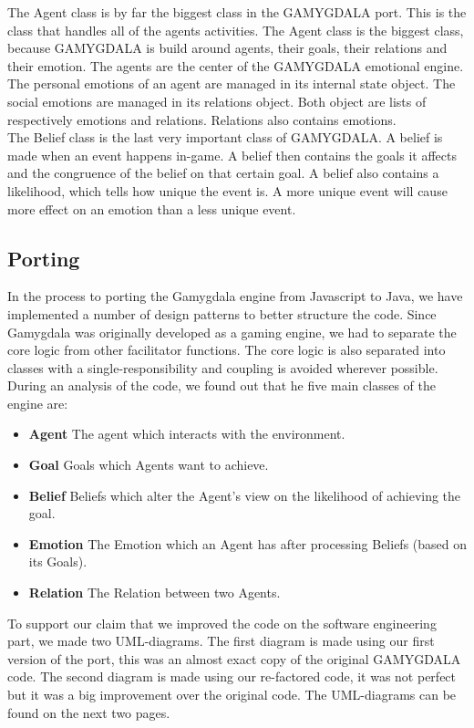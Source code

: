 The Agent class is by far the biggest class in the GAMYGDALA port. This is the class that handles all of the agents activities. The Agent class is the biggest class, because GAMYGDALA is build around agents, their goals, their relations and their emotion. The agents are the center of the GAMYGDALA emotional engine. The personal emotions of an agent are managed in its internal state object. The social emotions are managed in its relations object. Both object are lists of respectively emotions and relations. Relations also contains emotions. \\

The Belief class is the last very important class of GAMYGDALA. A belief is made when an event happens in-game. A belief then contains the goals it affects and the congruence of the belief on that certain goal. A belief also contains a likelihood, which tells how unique the event is. A more unique event will cause more effect on an emotion than a less unique event.

\subsection{Porting}
In the process to porting the Gamygdala engine from Javascript to Java, we have implemented a number of design patterns to better structure the code. Since Gamygdala was originally developed as a gaming engine, we had to separate the core logic from other facilitator functions. The core logic is also separated into classes with a single-responsibility and coupling is avoided wherever possible. \\

During an analysis of the code, we found out that he five main classes of the engine are:
\begin{itemize}
	\item \textbf{Agent} The agent which interacts with the environment.
	\item \textbf{Goal} Goals which Agents want to achieve.
	\item \textbf{Belief} Beliefs which alter the Agent's view on the likelihood of achieving the goal.
	\item \textbf{Emotion} The Emotion which an Agent has after processing Beliefs (based on its Goals).
	\item \textbf{Relation} The Relation between two Agents.
\end{itemize}

To support our claim that we improved the code on the software engineering part, we made two UML-diagrams. The first diagram is made using our first version of the port, this was an almost exact copy of the original GAMYGDALA code. The second diagram is made using our re-factored code, it was not perfect but it was a big improvement over the original code. The UML-diagrams can be found on the next two pages.\\

